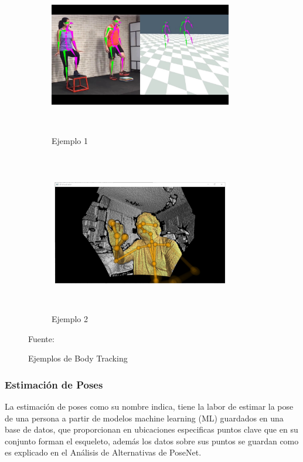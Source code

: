 \begin{figure}
	\centering
	\begin{subfigure}{.5\textwidth}
		\centering
		\includegraphics[width=8cm,height=7cm,]{./Images/examplebodytracking.jpg}
		\caption{Ejemplo 1}
		\label{bodyexa1}
	\end{subfigure}%
	\begin{subfigure}{0.5\textwidth}
		\centering
		\includegraphics[width=8cm,height=7cm,]{./Images/examplekinect.jpg}
		\caption{Ejemplo 2}
		\label{bodyexa2}
	\end{subfigure}
	\caption{Ejemplos de Body Tracking}
	\footnotesize Fuente: \cite{examplebodytracking} \cite{examplekinect}
	\label{bodyexafigure}
\end{figure}

\subsubsection{Estimación de Poses}

La estimación de poses como su nombre indica, tiene la labor de estimar la pose de una persona a partir de modelos machine learning (ML) guardados en una base de datos, que proporcionan en ubicaciones especificas puntos clave que en su conjunto forman el esqueleto, además los datos sobre sus puntos se guardan como es explicado en el Análisis de Alternativas de PoseNet.


